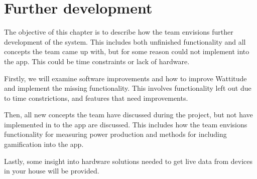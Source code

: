 \chapter{Further development}
\label{chapter:further}

The objective of this chapter is to describe how the team envisions further development of the system. This includes both unfinished functionality and all concepts the team came up with, but for some reason could not implement into the app. This could be time constraints or lack of hardware.

Firstly, we will examine software improvements and how to improve Wattitude and implement the missing functionality. This involves functionality left out due to time constrictions, and features that need improvements. 

Then, all new concepts the team have discussed during the project, but not have implemented in to the app are discussed. This includes how the team envisions functionality for measuring power production and methods for including gamification into the app. 

Lastly, some insight into hardware solutions needed to get live data from devices in your house will be provided. 




